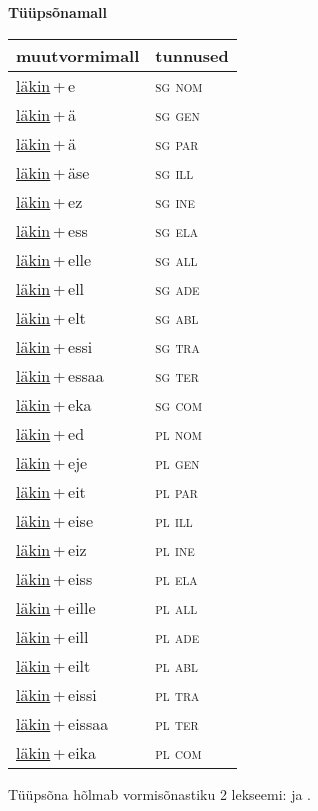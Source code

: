 
\vspace{1.8em}
\begin{minipage}{\textwidth}
\textbf{Tüüpsõnamall \,}\\

\begin{sideways}
\begin{tabular}{l l}
muutvormimall & tunnused \\
\hline
\underline{läkin}\,+\,e & \textsc{ sg nom } \\
\underline{läkin}\,+\,ä & \textsc{ sg gen } \\
\underline{läkin}\,+\,ä & \textsc{ sg par } \\
\underline{läkin}\,+\,äse & \textsc{ sg ill } \\
\underline{läkin}\,+\,ez & \textsc{ sg ine } \\
\underline{läkin}\,+\,ess & \textsc{ sg ela } \\
\underline{läkin}\,+\,elle & \textsc{ sg all } \\
\underline{läkin}\,+\,ell & \textsc{ sg ade } \\
\underline{läkin}\,+\,elt & \textsc{ sg abl } \\
\underline{läkin}\,+\,essi & \textsc{ sg tra } \\
\underline{läkin}\,+\,essaa & \textsc{ sg ter } \\
\underline{läkin}\,+\,eka & \textsc{ sg com } \\
\underline{läkin}\,+\,ed & \textsc{ pl nom } \\
\underline{läkin}\,+\,eje & \textsc{ pl gen } \\
\underline{läkin}\,+\,eit & \textsc{ pl par } \\
\underline{läkin}\,+\,eise & \textsc{ pl ill } \\
\underline{läkin}\,+\,eiz & \textsc{ pl ine } \\
\underline{läkin}\,+\,eiss & \textsc{ pl ela } \\
\underline{läkin}\,+\,eille & \textsc{ pl all } \\
\underline{läkin}\,+\,eill & \textsc{ pl ade } \\
\underline{läkin}\,+\,eilt & \textsc{ pl abl } \\
\underline{läkin}\,+\,eissi & \textsc{ pl tra } \\
\underline{läkin}\,+\,eissaa & \textsc{ pl ter } \\
\underline{läkin}\,+\,eika & \textsc{ pl com } \\
\end{tabular}
\end{sideways}
\label{tab:tüüpsõnamall-läkine}

\end{minipage}

 
\vspace{1em}
\noindent Tüüpsõna hõlmab vormisõnastiku 2 lekseemi:  ja .
